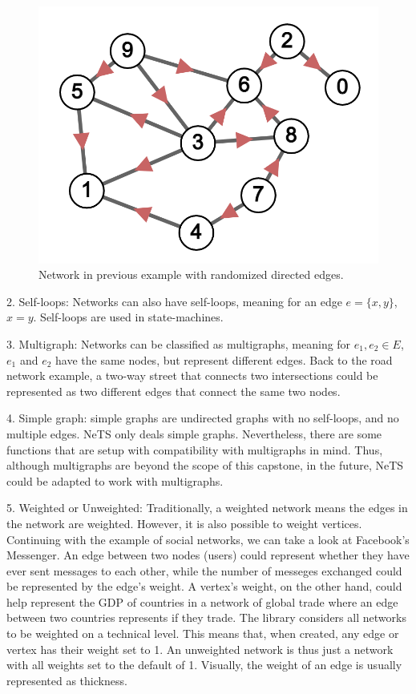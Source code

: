 \begin{figure}[H]
  \centering
  \includegraphics[scale=.25]{img/directed_sample.png}
  \caption{Network in previous example with randomized directed edges.}
  \label{fig:net_di}
\end{figure}

2. Self-loops: Networks can also have self-loops, meaning for an edge $e=\{x,y\}$, $x=y$.
Self-loops are used in state-machines.

3. Multigraph: Networks can be classified as multigraphs,
meaning for $e_1,e_2\in E$, $e_1$ and $e_2$
have the same nodes, but represent different edges.
Back to the road network example, a two-way street that connects two
intersections could be represented as two different edges that connect the same two nodes.

4. Simple graph: simple graphs are undirected graphs with no self-loops, and no multiple edges.
NeTS only deals simple graphs.
Nevertheless, there are some functions that are setup with compatibility with
multigraphs in mind.
Thus, although multigraphs are beyond the scope of this capstone,
in the future, NeTS could be adapted to work with multigraphs.

5. Weighted or Unweighted: Traditionally, a weighted network means the edges in the network are weighted.
However, it is also possible to weight vertices.
Continuing with the example of social networks,
we can take a look at Facebook's Messenger.
An edge between two nodes (users) could represent
whether they have ever sent messages to each other,
while the number of messeges exchanged could
be represented by the edge's weight.
A vertex's weight, on the other hand,
could help represent the GDP of countries in a
network of global trade where an edge between
two countries represents if they trade.
The library considers all networks to be weighted on a technical level.
This means that, when created, any edge or vertex has their weight set to 1.
An unweighted network is thus just a network with all weights set to the default of 1.
Visually, the weight of an edge is usually represented as thickness.

